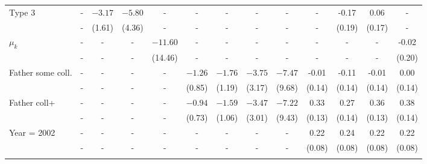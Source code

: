 \begin{tabular}{lcccccccccccc}
Type 3&-&$-3.17$&$-5.80$&-&-&-&-&-&-&-0.17&0.06&-\\
&-&(1.61)&(4.36)&-&-&-&-&-&-&(0.19)&(0.17)&-\\
$\mu_{k}$&-&-&-&$-11.60$&-&-&-&-&-&-&-&-0.02\\
&-&-&-&(14.46)&-&-&-&-&-&-&-&(0.20)\\
Father some coll.&-&-&-&-&$-1.26$&$-1.76$&$-3.75$&$-7.47$&-0.01&-0.11&-0.01&0.00\\
&-&-&-&-&(0.85)&(1.19)&(3.17)&(9.68)&(0.14)&(0.14)&(0.14)&(0.14)\\
Father coll+&-&-&-&-&$-0.94$&$-1.59$&$-3.47$&$-7.22$&0.33&0.27&0.36&0.38\\
&-&-&-&-&(0.73)&(1.06)&(3.01)&(9.43)&(0.13)&(0.14)&(0.13)&(0.14)\\
Year = 2002&-&-&-&-&-&-&-&-&0.22&0.24&0.22&0.22\\
&-&-&-&-&-&-&-&-&(0.08)&(0.08)&(0.08)&(0.08)\\
\\
\bottomrule\end{tabular}